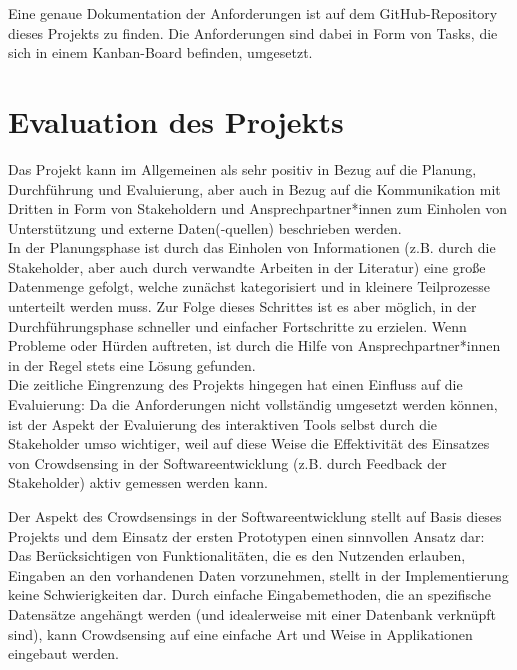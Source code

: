 Eine genaue Dokumentation der Anforderungen ist auf dem GitHub-Repository dieses Projekts zu finden. Die Anforderungen sind dabei in Form von Tasks, die sich in einem Kanban-Board befinden, umgesetzt.

\section{Evaluation des Projekts}
\label{sec:personal_evaluation}
Das Projekt kann im Allgemeinen als sehr positiv in Bezug auf die Planung, Durchführung und Evaluierung, aber auch in Bezug auf die Kommunikation mit Dritten in Form von Stakeholdern und Ansprechpartner*innen zum Einholen von Unterstützung und externe Daten(-quellen) beschrieben werden. \\ In der Planungsphase ist durch das Einholen von Informationen (z.B. durch die Stakeholder, aber auch durch verwandte Arbeiten in der Literatur) eine große Datenmenge gefolgt, welche zunächst kategorisiert und in kleinere Teilprozesse unterteilt werden muss. Zur Folge dieses Schrittes ist es aber möglich, in der Durchführungsphase schneller und einfacher Fortschritte zu erzielen. Wenn Probleme oder Hürden auftreten, ist durch die Hilfe von Ansprechpartner*innen in der Regel stets eine Lösung gefunden. \\ Die zeitliche Eingrenzung des Projekts hingegen hat einen Einfluss auf die Evaluierung: Da die Anforderungen nicht vollständig umgesetzt werden können, ist der Aspekt der Evaluierung des interaktiven Tools selbst durch die Stakeholder umso wichtiger, weil auf diese Weise die Effektivität des Einsatzes von Crowdsensing in der Softwareentwicklung (z.B. durch Feedback der Stakeholder) aktiv gemessen werden kann.

Der Aspekt des Crowdsensings in der Softwareentwicklung stellt auf Basis dieses Projekts und dem Einsatz der ersten Prototypen einen sinnvollen Ansatz dar: Das Berücksichtigen von Funktionalitäten, die es den Nutzenden erlauben, Eingaben an den vorhandenen Daten vorzunehmen, stellt in der Implementierung keine Schwierigkeiten dar. Durch einfache Eingabemethoden, die an spezifische Datensätze angehängt werden (und idealerweise mit einer Datenbank verknüpft sind), kann Crowdsensing auf eine einfache Art und Weise in Applikationen eingebaut werden.

